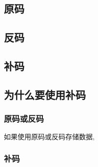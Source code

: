 \begin{issues}
\issueDraft
\end{issues}


\subsection{原码}

\subsection{反码}

\subsection{补码}

\subsection{为什么要使用补码}

\subsubsection{原码或反码}

如果使用原码或反码存储数据,

\subsubsection{补码}



